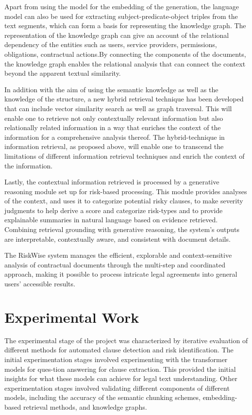 Apart from using the model for the embedding of the generation, the language model can also be used for extracting subject-predicate-object triples from the text segments, which can form a basis for representing the knowledge graph. The representation of the knowledge graph can give an account of the relational dependency of the entities such as users, service providers, permissions, obligations,
contractual actions.By connecting the
components of the documents, the knowledge graph enables the
relational analysis that can connect the context beyond the apparent
textual similarity.

In addition with the aim of using the semantic knowledge as well as the 
knowledge of the structure, a new hybrid retrieval technique 
has been developed that can include vector similarity 
search as well as graph 
traversal. This will enable one to 
retrieve not only contextually relevant information but also 
relationally related information in a way that enriches the context of 
the information for a comprehensive analysis thereof. The hybrid-technique 
in information retrieval, as proposed above, will enable one to 
transcend the limitations of different information retrieval 
techniques and enrich the context of the information.

Lastly, the contextual information retrieved is processed by a
generative reasoning module set up for risk-based processing. This
module provides analyses of the context, and uses it to categorize
potential risky clauses, to make severity judgments to help derive a
score and categorize risk-types and to provide explainable summaries
in natural language based on evidence retrieved. Combining retrieval
grounding with generative reasoning, the system's outputs are
interpretable, contextually aware, and consistent with document details.

The RiskWise system manages the efficient, explorable and
context-sensitive analysis of contractual documents through the
multi-step and coordinated approach, making it possible to process
intricate legal agreements into general users’ accessible results.

\section{Experimental  Work}
The experimental stage of the project was characterized by iterative
evaluation of different methods for automated clause detection and
risk identification. The initial experimentation stages involved experimenting with the transformer models for ques-tion answering for clause extraction. This provided the initial insights for what these models can
achieve for legal text understanding. Other experimentation stages involved validating different
components of different models, including the accuracy of the semantic chunking schemes, embedding-based retrieval methods, and knowledge graphs.

